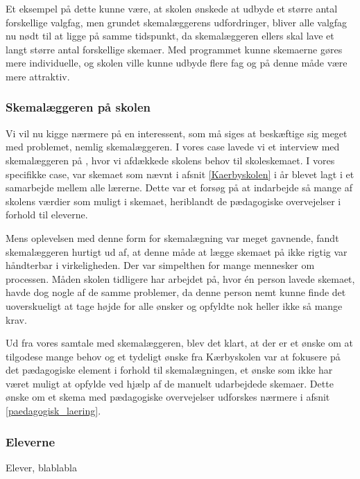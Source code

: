 Et eksempel på dette kunne være, at skolen ønskede at udbyde et større antal forskellige valgfag, men grundet skemalæggerens udfordringer, bliver alle valgfag nu nødt til at ligge på samme tidspunkt, da skemalæggeren ellers skal lave et langt større antal forskellige skemaer. Med programmet kunne skemaerne gøres mere individuelle, og skolen ville kunne udbyde flere fag og på denne måde være mere attraktiv.

\subsubsection{Skemalæggeren på skolen}
Vi vil nu kigge nærmere på en interessent, som må siges at beskæftige sig meget med problemet, nemlig skemalæggeren. I vores case lavede vi et interview med skemalæggeren på \school, hvor vi afdækkede skolens behov til skoleskemaet. I vores specifikke case, var skemaet som nævnt i afsnit \ref{Kaerbyskolen} i år blevet lagt i et samarbejde mellem alle lærerne. Dette var et forsøg på at indarbejde så mange af skolens værdier som muligt i skemaet, heriblandt de pædagogiske overvejelser i forhold til eleverne.

Mens oplevelsen med denne form for skemalægning var meget gavnende, fandt skemalæggeren hurtigt ud af, at denne måde at lægge skemaet på ikke rigtig var håndterbar i virkeligheden. Der var simpelthen for mange mennesker om processen. Måden skolen tidligere har arbejdet på, hvor \'en person lavede skemaet, havde dog nogle af de samme problemer, da denne person nemt kunne finde det uoverskueligt at tage højde for alle ønsker og opfyldte nok heller ikke så mange krav.

Ud fra vores samtale med skemalæggeren, blev det klart, at der er et ønske om at tilgodese mange behov og et tydeligt ønske fra Kærbyskolen var at fokusere på det pædagogiske element i forhold til skemalægningen, et ønske som ikke har været muligt at opfylde ved hjælp af de manuelt udarbejdede skemaer. Dette ønske om et skema med pædagogiske overvejelser udforskes nærmere i afsnit \ref{paedagogisk_laering}.

\subsubsection{Eleverne}
Elever, blablabla

